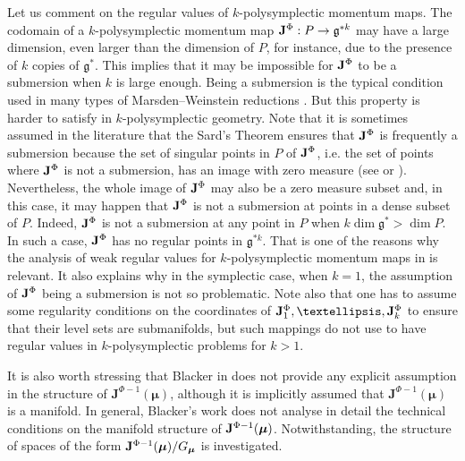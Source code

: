 \documentclass[11pt]{article}
\theoremstyle{plain}
\theoremstyle{definition}
\numberwithin{equation}{section}
\begin{document}
Let us comment on the regular values of $k$-polysymplectic momentum maps. The codomain of a $k$-polysymplectic momentum map ${\bf J}^{\Phi}:P\rightarrow \mathfrak{g}^{*k}$ may have a large dimension, even larger than the dimension of $P$, for instance, due to the presence of $k$ copies of $\mathfrak{g}^*$. This implies that it may be impossible for ${\bf J}^\Phi$ to be a submersion when $k$ is large enough. Being a submersion is the typical condition used in many types of Marsden--Weinstein reductions \cite{GM_23, MRSV_15}. But this property is harder to satisfy in $k$-polysymplectic geometry. Note that it is sometimes assumed in the literature that the Sard's Theorem ensures that ${\bf J}^\Phi$ is frequently a submersion because the set of singular points in $P$ of ${\bf J}^\Phi$, i.e. the set of points where ${\bf J}^\Phi$ is not a submersion, has an image with zero measure (see \cite[Lemma 3.4]{MRSV_10} or \cite{BR_04}). Nevertheless, the whole image of ${\bf J}^\Phi$ may also be a zero measure subset and, in this case, it may happen that ${\bf J}^\Phi$ is not a submersion at points in a dense subset of $P$. Indeed, ${\bf J}^\Phi$ is not a submersion at any point in $P$ when $ k\dim\mathfrak{g}^{*}>\dim P$. In such a case, ${\bf J}^\Phi$ has no regular points in $\mathfrak{g}^{*k}$. That is one of the reasons why the analysis of weak regular values for $k$-polysymplectic momentum maps in \cite{LRVZ_23} is relevant. It also explains why in the symplectic case, when $k=1$, the assumption of ${\bf J}^\Phi$ being a submersion is not so problematic. Note also that one has to assume some regularity conditions on the coordinates of ${\bf J}_1^{\Phi},\ldots,{\bf J}_k^{\Phi}$ to ensure that their level sets are submanifolds, but such mappings do not use to have regular values in $k$-polysymplectic problems for $k>1$.

It is also worth stressing that Blacker in \cite[Theorem 3.22]{Bla_19} does not provide any explicit assumption in the structure of $\mathbf{J}^{\Phi-1}(\bm\mu)$, although it is implicitly assumed that $\mathbf{J}^{\Phi-1}(\bm\mu)$ is a manifold. 
In general, Blacker's work \cite{Bla_19} does not analyse in detail the technical conditions on the manifold structure of ${\bf J}^{\Phi-1}(\bm \mu)$. Notwithstanding, the structure of spaces of the form ${\bf J}^{\Phi-1}(\bm \mu)/G_{\bm \mu}$ is investigated.
\end{document}
